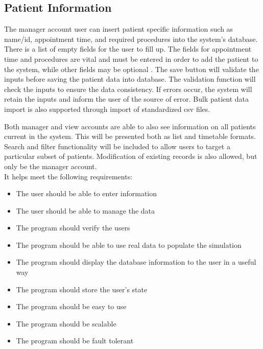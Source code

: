 \documentclass[12pt]{article}
\begin{document}
\subsection{Patient Information}
The manager account user can insert patient specific information such as name/id, appointment time, and required procedures into the system’s database. There is a list of empty fields for the user to fill up. The fields for appointment time and procedures are vital and must be entered in order to add the patient to the system, while other fields may be optional . The save button will validate the inputs before saving the patient data into database. The validation function will check the inputs to ensure the data consistency. If errors occur, the system will retain the inputs and inform the user of the source of error. Bulk patient data import is also supported through import of standardized csv files.

\noindent \newline
Both manager and view accounts are able to also see information on all patients current in the system. This will be presented both as list and timetable formats. Search and filter functionality will be included to allow users to target a particular subset of patients. Modification of existing records is also allowed, but only be the manager account.
\\
It helps meet the following requirements:
\begin{itemize}
	\item The user should be able to enter information
	\item The user should be able to manage the data
	\item The program should verify the users
	\item The program should be able to use real data to populate the simulation
	\item The program should display the database information to the user in a useful way
	\item The program should store the user's state
	\item The program should be easy to use
	\item The program should be scalable
	\item The program should be fault tolerant
\end{itemize}
\end{document}
